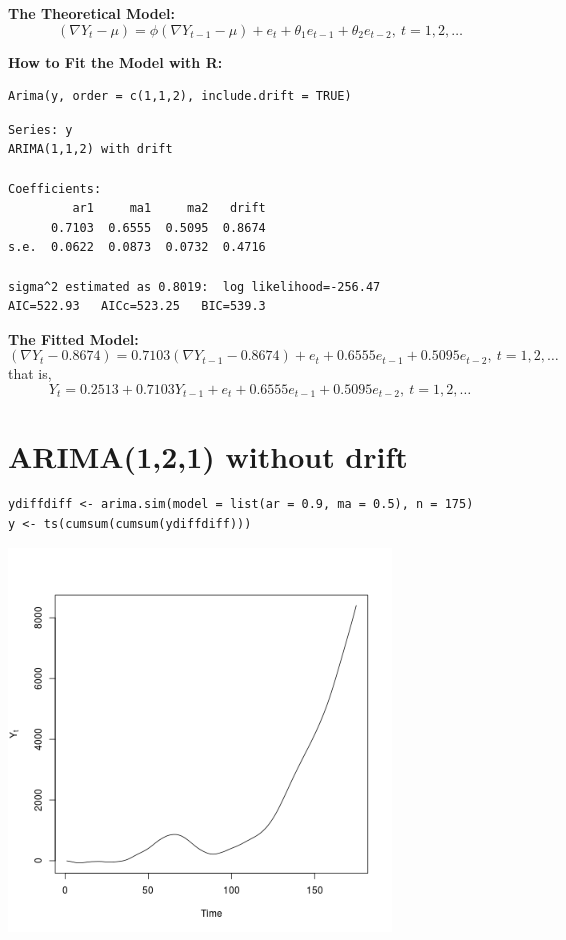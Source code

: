 \documentclass[12pt]{article}
\begin{document}
\noindent
\textbf{The Theoretical Model:} 
\[
(\nabla Y_{t} - \mu) = \phi(\nabla Y_{t - 1} - \mu) +  e_{t} + \theta_{1} e_{t - 1} + \theta_{2} e_{t - 2},\ t = 1,2,\ldots
\]

\noindent
\textbf{How to Fit the Model with R:}


\begin{verbatim}
Arima(y, order = c(1,1,2), include.drift = TRUE)
\end{verbatim}




\begin{verbatim}
Series: y 
ARIMA(1,1,2) with drift         

Coefficients:
         ar1     ma1     ma2   drift
      0.7103  0.6555  0.5095  0.8674
s.e.  0.0622  0.0873  0.0732  0.4716

sigma^2 estimated as 0.8019:  log likelihood=-256.47
AIC=522.93   AICc=523.25   BIC=539.3
\end{verbatim}

\noindent
\textbf{The Fitted Model:} 
\[
(\nabla Y_{t} - 0.8674 ) = 0.7103 (\nabla Y_{t - 1} - 0.8674 ) + e_{t} + 0.6555 e_{t - 1} + 0.5095 e_{t - 2},\ t = 1,2,\ldots
\]
that is,
\[
Y_{t} = 0.2513 + 0.7103 Y_{t - 1} + e_{t} + 0.6555 e_{t - 1} + 0.5095 e_{t - 2},\ t = 1,2,\ldots
\]
\section*{ARIMA(1,2,1) without drift}
\label{sec-9}


\begin{verbatim}
ydiffdiff <- arima.sim(model = list(ar = 0.9, ma = 0.5), n = 175)
y <- ts(cumsum(cumsum(ydiffdiff)))
\end{verbatim}





\includegraphics[width=4.0in]{img/arima121zm.png}
\end{document}

